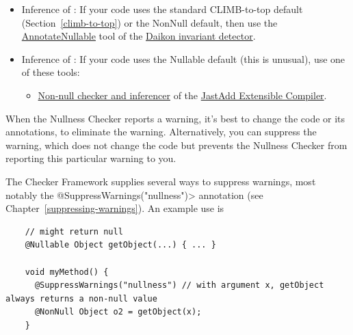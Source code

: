 \begin{itemize}

\item
  Inference of :
  If your code uses the standard CLIMB-to-top default (Section~\ref{climb-to-top}) or
  the NonNull default, then use the
  \href{https://plse.cs.washington.edu/daikon/download/doc/daikon.html#AnnotateNullable}{AnnotateNullable}
  tool of the \href{https://plse.cs.washington.edu/daikon/}{Daikon invariant
    detector}.

\item
  Inference of :
  If your code uses the Nullable default (this is unusual), use one of these tools:
\begin{itemize}
\item
  \href{https://jastadd.cs.lth.se/jastadd-tutorial-examples/non-null-types-for-java/}{Non-null
    checker and inferencer} of the \href{https://jastadd.cs.lth.se/}{JastAdd
    Extensible Compiler}.
\end{itemize}

\end{itemize}




When the Nullness Checker reports a warning, it's best to change the code
or its annotations, to eliminate the warning.  Alternatively, you can
suppress the warning, which does not change the code but prevents the
Nullness Checker from reporting this particular warning to you.

\begin{sloppypar}
The Checker Framework supplies several ways to suppress warnings, most
notably the \<@SuppressWarnings("nullness")> annotation (see
Chapter~\ref{suppressing-warnings}).  An example use is
\end{sloppypar}

\begin{smaller}
\begin{Verbatim}
    // might return null
    @Nullable Object getObject(...) { ... }

    void myMethod() {
      @SuppressWarnings("nullness") // with argument x, getObject always returns a non-null value
      @NonNull Object o2 = getObject(x);
    }
\end{Verbatim}
\end{smaller}


